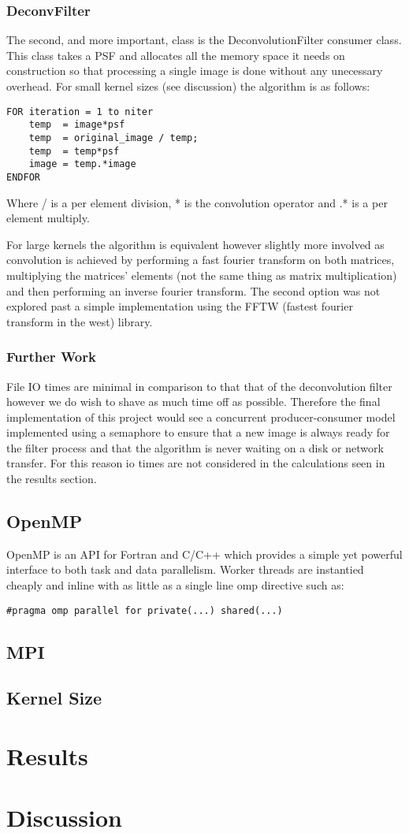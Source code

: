 \documentclass{article}
\begin{document}
\subsubsection{DeconvFilter}
The second, and more important, class is the DeconvolutionFilter consumer class.
This class takes a PSF and allocates all the memory space it needs on
construction so that processing a single image is done without any unecessary
overhead. For small kernel sizes (see discussion) the algorithm is as follows:
\begin{verbatim}
FOR iteration = 1 to niter
    temp  = image*psf
    temp  = original_image / temp;
    temp  = temp*psf
    image = temp.*image
ENDFOR
\end{verbatim}
Where / is a per element division, * is the convolution operator and .* is a per
element multiply.

For large kernels the algorithm is equivalent however slightly more involved as
convolution is achieved by performing a fast fourier transform on both matrices,
multiplying the matrices' elements (not the same thing as matrix multiplication)
and then performing an inverse fourier transform. The second option was not
explored past a simple implementation using the FFTW (fastest fourier transform
in the west) library.

\subsubsection{Further Work}
File IO times are minimal in comparison to that that of the deconvolution filter
however we do wish to shave as much time off as possible. Therefore the final
implementation of this project would see a concurrent producer-consumer model
implemented using a semaphore to ensure that a new image is always ready for the
filter process and that the algorithm is never waiting on a disk or network
transfer. For this reason io times are not considered in the calculations seen
in the results section.

\subsection{OpenMP}
OpenMP is an API for Fortran and C/C++ which provides a simple yet powerful
interface to both task and data parallelism. Worker threads are instantied
cheaply and inline with as little as a single line omp directive such as:
\begin{verbatim}
#pragma omp parallel for private(...) shared(...)
\end{verbatim}


\subsection{MPI}

\subsection{Kernel Size}

\section{Results}

\section{Discussion}
\end{document}
